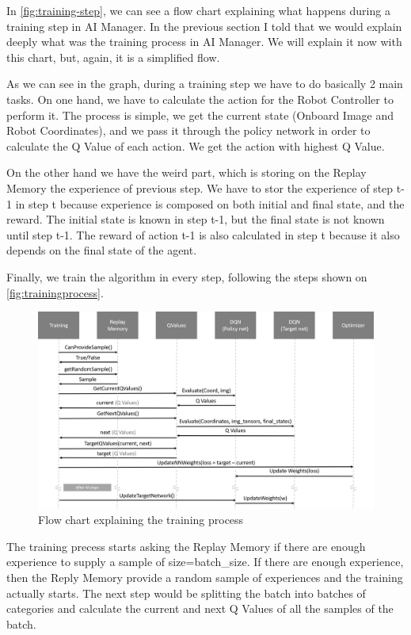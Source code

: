 				In \autoref{fig:training-step}, we can see a flow chart explaining what happens during a training step in AI Manager. In the previous section I told that we would explain deeply what was the training process in AI Manager. We will explain it now with this chart, but, again, it is a simplified flow.
				
				As we can see in the graph, during a training step we have to do basically 2 main tasks. On one hand, we have to calculate the action for the Robot Controller to perform it. The process is simple, we get the current state (Onboard Image and Robot Coordinates), and we pass it through the policy network in order to calculate the Q Value of each action. We get the action with highest Q Value. 
				
				On the other hand we have the weird part, which is storing on the Replay Memory the experience of previous step. We have to stor the experience of step t-1 in step t because experience is composed on both initial and final state, and the reward. The initial state is known in step t-1, but the final state is not known until step t-1. The reward of action t-1 is also calculated in step t because it also depends on the final state of the agent.
				
				Finally, we train the algorithm in every step, following the steps shown on \autoref{fig:trainingprocess}.
				
				\begin{figure}[H]
					\centering
					\includegraphics[width=1\linewidth]{Images/TrainingProcess}
					\caption[Training Process]{Flow chart explaining the training process}
					\label{fig:trainingprocess}
				\end{figure}
			
				The training precess starts asking the Replay Memory if there are enough experience to supply a sample of size=batch\_size. If there are enough experience, then the Reply Memory provide a random sample of experiences and the training actually starts. The next step would be splitting the batch into batches of categories and calculate the current and next Q Values of all the samples of the batch.
				
